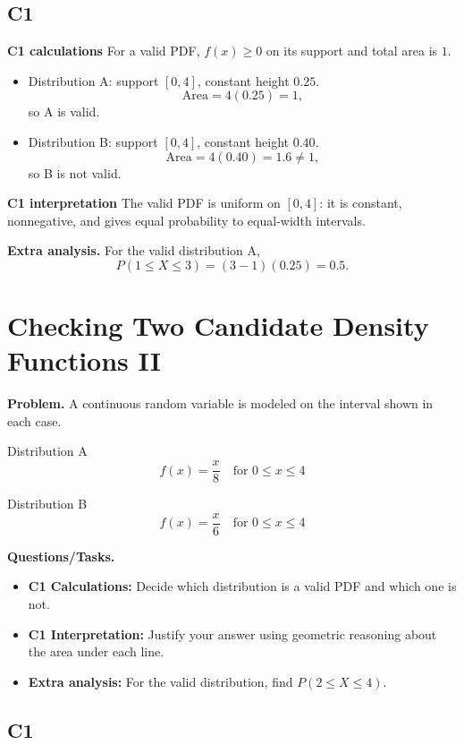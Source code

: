 \subsection*{C1}

\textbf{C1 calculations}
For a valid PDF, $f(x)\ge 0$ on its support and total area is $1$.
\begin{itemize}
	\item Distribution A: support $[0,4]$, constant height $0.25$.
	\[
	\text{Area}=4(0.25)=1,
	\]
	so A is valid.
	\item Distribution B: support $[0,4]$, constant height $0.40$.
	\[
	\text{Area}=4(0.40)=1.6\ne1,
	\]
	so B is not valid.
\end{itemize}

\textbf{C1 interpretation}
The valid PDF is uniform on $[0,4]$: it is constant, nonnegative, and gives equal probability to equal-width intervals.

\textbf{Extra analysis.}
For the valid distribution A,
\[
P(1\le X\le 3)=(3-1)(0.25)=0.5.
\]

\section{Checking Two Candidate Density Functions II}
	
	\textbf{Problem.}
	A continuous random variable is modeled on the interval shown in each case.
	
	Distribution A
	\[
	f(x)=\frac{x}{8}\quad\text{for }0\le x\le 4
	\]
	
	Distribution B
	\[
	f(x)=\frac{x}{6}\quad\text{for }0\le x\le 4
	\]
	
	\textbf{Questions/Tasks.}
	\begin{itemize}
		\item \textbf{C1 Calculations:} Decide which distribution is a valid PDF and which one is not.
		\item \textbf{C1 Interpretation:} Justify your answer using geometric reasoning about the area under each line.
		\item \textbf{Extra analysis:} For the valid distribution, find $P(2\le X\le 4)$.
	\end{itemize}

	\subsection*{C1}

